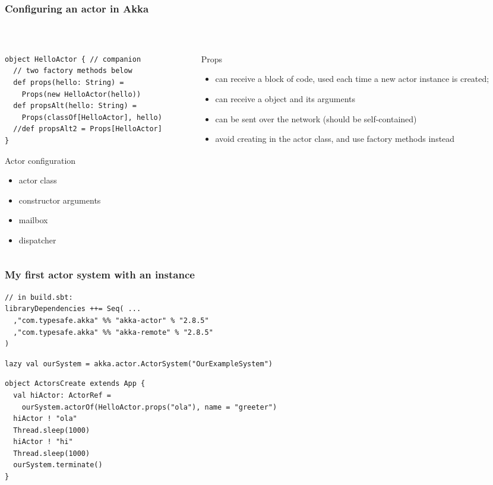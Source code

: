 \documentclass[aspectratio=169]{beamer}
\begin{document}
\begin{frame}[fragile]\frametitle{Configuring an actor in Akka}
~\\[-6mm]
\begin{columns}
\begin{column}{0.51\textwidth}
\begin{lstlisting}[emph={Actor, Logging, Props}]
object HelloActor { // companion
  // two factory methods below
  def props(hello: String) =
    Props(new HelloActor(hello))
  def propsAlt(hello: String) =
    Props(classOf[HelloActor], hello)
  //def propsAlt2 = Props[HelloActor]
}
\end{lstlisting}
\begin{exampleblock}{Actor configuration}
  \begin{itemize}
      \item actor class
      \item constructor arguments
      \item mailbox
      \item dispatcher
  \end{itemize} 
\end{exampleblock}
\end{column}
\begin{column}{0.49\textwidth}
\begin{block}{Props}
  \begin{itemize}
    \item can receive a block of code,
     used each time a new actor instance is created;
     \item can receive a  object and its arguments
     \item can be sent over the network (should be self-contained)
     \item avoid creating  in the actor class, and use factory methods instead
  \end{itemize}
\end{block}
\end{column}
\end{columns}
\end{frame}

\begin{frame}[fragile]\frametitle{My first actor system with an instance}
\begin{lstlisting}[emph={Actor, Logging, Props, ourSystem}]
// in build.sbt:
libraryDependencies ++= Seq( ...
  ,"com.typesafe.akka" %% "akka-actor" % "2.8.5"
  ,"com.typesafe.akka" %% "akka-remote" % "2.8.5"
)
\end{lstlisting}
\begin{lstlisting}[emph={Actor, Logging, Props, ourSystem}]
lazy val ourSystem = akka.actor.ActorSystem("OurExampleSystem")
\end{lstlisting}
\begin{lstlisting}[emph={Actor, Logging, Props, ourSystem,terminate,sleep,actorOf}]
object ActorsCreate extends App {
  val hiActor: ActorRef =
    ourSystem.actorOf(HelloActor.props("ola"), name = "greeter")
  hiActor ! "ola"
  Thread.sleep(1000)
  hiActor ! "hi"
  Thread.sleep(1000)
  ourSystem.terminate()
}
\end{lstlisting}
\end{frame}
\end{document}
